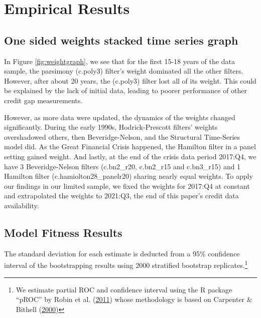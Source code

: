 \documentclass[
  12pt,
]{article}
\begin{document}
\hypertarget{empirical-results}{%
\section{Empirical Results}\label{empirical-results}}

\hypertarget{weight-graphs}{%
\subsection{One sided weights stacked time series graph}\label{weight-graphs}}

In Figure \ref{fig:weightgraph}, we see that for the first 15-18 years of the data sample, the parsimony (c.poly3) filter's weight dominated all the other filters. However, after about 20 years, the (c.poly3) filter lost all of its weight. This could be explained by the lack of initial data, leading to poorer performance of other credit gap measurements.

However, as more data were updated, the dynamics of the weights changed significantly. During the early 1990s, Hodrick-Prescott filters' weights overshadowed others, then Beveridge-Nelson, and the Structural Time-Series model did. As the Great Financial Crisis happened, the Hamilton filter in a panel setting gained weight. And lastly, at the end of the crisis data period 2017:Q4, we have 3 Beveridge-Nelson filters (c.bn2\_r20, c.bn2\_r15 and c.bn3\_r15) and 1 Hamilton filter (c.hamiolton28\_panelr20) sharing nearly equal weights. To apply our findings in our limited sample, we fixed the weights for 2017:Q4 at constant and extrapolated the weights to 2021:Q3, the end of this paper's credit data availability.

\hypertarget{model-fit}{%
\subsection{Model Fitness Results}\label{model-fit}}

The standard deviation for each estimate is deducted from a 95\% confidence interval of the bootstrapping results using 2000 stratified bootstrap replicates.\footnote{We estimate partial ROC and confidence interval using the R package ``pROC'' by Robin et al. (\protect\hyperlink{ref-robin_proc_2011}{2011}) whose methodology is based on Carpenter \& Bithell (\protect\hyperlink{ref-carpenter_bootstrap_2000}{2000})}
\end{document}
